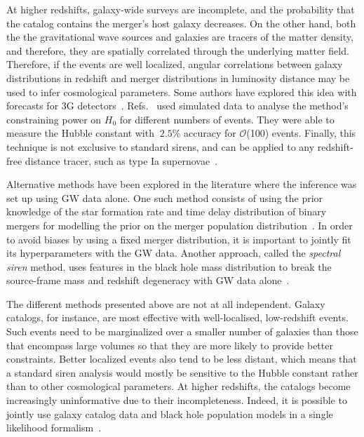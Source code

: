 \documentclass[%
preprint,
nofootinbib,
 amsmath,amssymb,
 aps,
]{revtex4-2}
\begin{document}
At higher redshifts, galaxy-wide surveys are incomplete, and the probability that the catalog
contains the merger's host galaxy decreases. On the other hand, both the the gravitational wave
sources and galaxies are tracers of the matter density, and therefore, they are spatially
correlated through the underlying matter field. Therefore, if the events are well localized,
angular correlations between galaxy distributions in redshift and merger distributions in
luminosity distance may be used to infer cosmological parameters. Some authors have explored this
idea with forecasts for 3G detectors~\cite{Oguri_2016}. Refs.~
used simulated data to analyse the method's constraining power on $H_0$ for different numbers of
events. They were able to measure the Hubble constant with $~ 2.5\%$ accuracy for
$\mathcal{O}$(100) events. Finally, this technique is not exclusive to standard sirens, and can be
applied to any redshift-free distance tracer, such as type Ia
supernovae~\cite{mukherjee2018classical}.

Alternative methods have been explored in the literature where the inference was set up using GW
data alone. One such method consists of using the prior knowledge of the star formation rate and
time delay distribution of binary mergers for modelling the prior on the merger population
distribution~\cite{Ding_2019, Ye_2021, Leandro_2022}. In order to avoid biases by using a fixed
merger distribution, it is important to jointly fit its hyperparameters with the GW data. Another
approach, called the \textit{spectral siren} method, uses features in the black hole mass
distribution to break the source-frame mass and redshift degeneracy with GW data
alone~\cite{Ezquiaga:2022zkx}.

The different methods presented above are not at all independent. Galaxy catalogs, for instance,
are most effective with well-localised, low-redshift events. Such events need to be marginalized
over a smaller number of galaxies than those that encompass large volumes so that they are more
likely to provide better constraints. Better localized events also tend to be less distant, which
means that a standard siren analysis would mostly be sensitive to the Hubble constant rather than
to other cosmological parameters. At higher redshifts, the catalogs become increasingly
uninformative due to their incompleteness. Indeed, it is possible to jointly use galaxy catalog
data and black hole population models in a single likelihood
formalism~\cite{Mastrogiovanni:2023emh,gray2023joint}.
\end{document}
